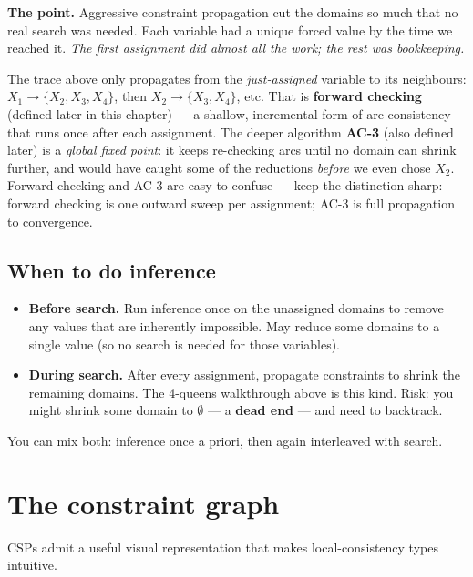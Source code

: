 \documentclass[11pt, a4paper]{article}
\begin{document}
\textbf{The point.} Aggressive constraint propagation cut the domains so much that no real search was needed. Each variable had a unique forced value by the time we reached it. \emph{The first assignment did almost all the work; the rest was bookkeeping.}

\begin{pitfallbox}
The trace above only propagates from the \emph{just-assigned} variable to its neighbours: $X_1 \to \{X_2, X_3, X_4\}$, then $X_2 \to \{X_3, X_4\}$, etc. That is \textbf{forward checking} (defined later in this chapter) — a shallow, incremental form of arc consistency that runs once after each assignment. The deeper algorithm \textbf{AC-3} (also defined later) is a \emph{global fixed point}: it keeps re-checking arcs until no domain can shrink further, and would have caught some of the reductions \emph{before} we even chose $X_2$. Forward checking and AC-3 are easy to confuse — keep the distinction sharp: forward checking is one outward sweep per assignment; AC-3 is full propagation to convergence.
\end{pitfallbox}

\subsection{When to do inference}

\begin{itemize}
  \item \textbf{Before search.} Run inference once on the unassigned domains to remove any values that are inherently impossible. May reduce some domains to a single value (so no search is needed for those variables).
  \item \textbf{During search.} After every assignment, propagate constraints to shrink the remaining domains. The 4-queens walkthrough above is this kind. Risk: you might shrink some domain to $\emptyset$ — a \textbf{dead end} — and need to backtrack.
\end{itemize}

You can mix both: inference once a priori, then again interleaved with search.

\section{The constraint graph}

CSPs admit a useful visual representation that makes local-consistency types intuitive.
\end{document}
